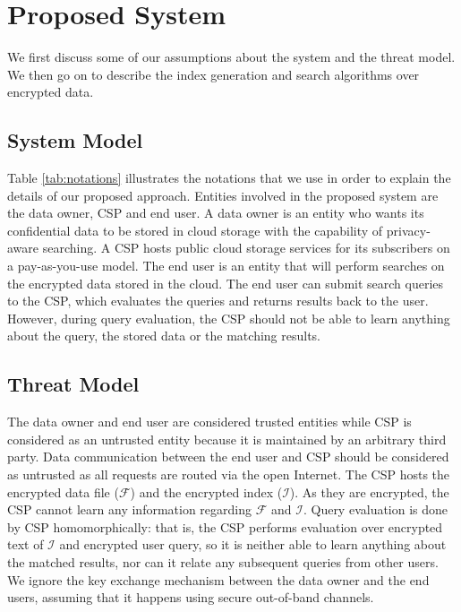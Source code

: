 \section{Proposed System}
\label{sec:system}


We first discuss some of our assumptions
about the system and the threat model. We then go on to describe 
the index generation
and search algorithms over encrypted data.

\subsection{System Model}

Table \ref{tab:notations} illustrates the notations that we use in order to explain
the details of our proposed approach.
Entities involved in the proposed system are the data owner, CSP and end user.
A data owner is an entity who wants its confidential data to be stored in cloud storage with the capability of privacy-aware searching. 
A CSP hosts public cloud storage services for its subscribers on 
a pay-as-you-use model. The end user is an entity that will perform searches on the 
encrypted data stored in the cloud. The end user can submit search queries 
to the CSP, which evaluates the queries and returns results back to the user. 
However, during query evaluation, the CSP should not be able to learn anything about the query, 
the stored data or the matching results.


\subsection{Threat Model}

The data owner and end user are considered trusted entities while CSP 
is considered as an untrusted entity because it is maintained by an 
arbitrary third party. Data communication between the end user and CSP should 
be considered as untrusted as all requests are routed via the open Internet. 
The CSP hosts the encrypted data file ($\mathcal{F}$) and the encrypted index ($\mathcal{I}$). 
As they are encrypted, the CSP cannot learn any information regarding $\mathcal{F}$ and $\mathcal{I}$. 
Query evaluation is done by CSP homomorphically: that is, the CSP performs 
evaluation over encrypted text of $\mathcal{I}$ and encrypted user query, 
so it is neither able to learn anything about the matched results, nor
can it relate any subsequent queries from other users. 
We ignore the key exchange mechanism between the data owner and the end users, assuming
that it happens using secure out-of-band channels.

